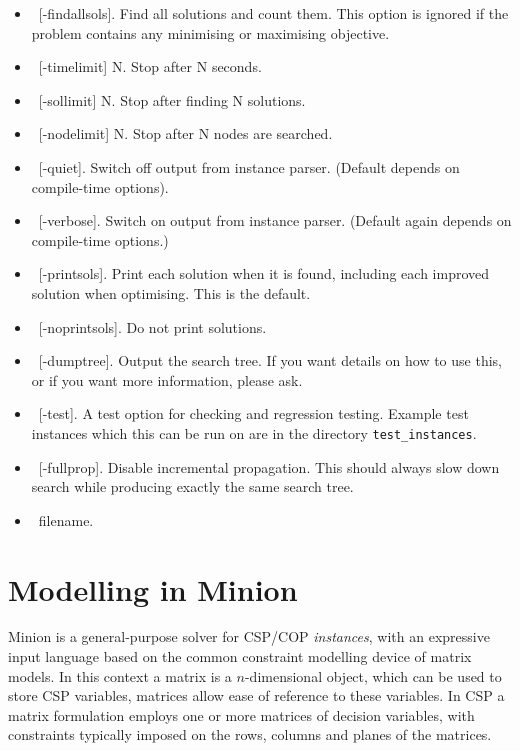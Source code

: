 \documentclass{article}
\begin{document}
\begin{small}
\begin{itemize}
\item\ [-findallsols].   Find all solutions and count them.   This option is ignored if the problem contains any minimising or maximising objective.
\item\ [-timelimit] N. Stop after N seconds.
\item\ [-sollimit] N. Stop after finding N solutions.
\item\ [-nodelimit] N. Stop after N nodes are searched.
\item\ [-quiet]. Switch off output from instance parser.  (Default depends on compile-time options).
\item\ [-verbose]. Switch on output from instance parser.  (Default again depends on compile-time options.)
\item\ [-printsols].   Print each solution when it is found, including each improved solution when optimising.  This is the default.
\item\ [-noprintsols].   Do not print solutions.
\item\ [-dumptree]. Output the search tree. If you want details on how to use this, or if you want more information, please ask.
\item\ [-test].  A test option for checking and regression testing.   Example test instances which this can be run on are in the directory {\tt test\_instances}.   
\item\ [-fullprop]. Disable incremental propagation. This should always slow down search while producing exactly the same search tree.
\item\ filename.
\end{itemize}

\section{Modelling in {\sc Minion}}\label{sect_matrix}

{\sc Minion} is a general-purpose solver for CSP/COP {\em instances},
with an expressive input language based on the common constraint
modelling device of matrix models. In this context a matrix is a
$n$-dimensional object, which can be used to store CSP variables,
matrices allow ease of reference to these variables. In CSP a matrix
formulation employs one or more matrices of decision variables, with
constraints typically imposed on the rows, columns and planes of the
matrices.


\end{small}
\end{document}
